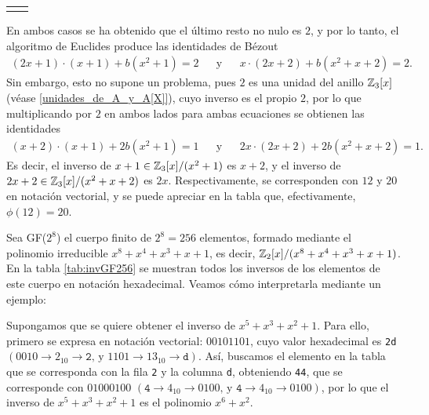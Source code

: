 \begin{Revision}
\begin{ejs}
\begin{center}
\begin{tabular}{cc}
\begin{minipage}[t]{0.4\textwidth}
                \end{minipage}
            \end{tabular}
        \end{center}
        En ambos casos se ha obtenido que el último resto no nulo es $2$, y por lo tanto, el algoritmo de Euclides produce las identidades de Bézout
        \begin{align*}
            (2x+1)\cdot (x + 1) + b(x^2 + 1) = 2 && \text{y} && x\cdot (2x+2) + b(x^2+x+2) = 2.
        \end{align*}
         Sin embargo, esto no supone un problema, pues $2$ es una unidad del anillo $\mathbb{Z}_3[x]$ (véase \ref{unidades_de_A_y_A[X]}), cuyo inverso es el propio $2$, por lo que multiplicando por $2$ en ambos lados para ambas ecuaciones se obtienen las identidades
         \begin{align*}
            (x+2)\cdot (x + 1) + 2b(x^2 + 1) = 1 && \text{y} && 2x\cdot (2x+2) + 2b(x^2+x+2) = 1.
        \end{align*}
         Es decir, el inverso de $x + 1 \in \mathbb{Z}_3[x]/(x^2 + 1)$ es $x + 2 $, y el inverso de $2x + 2 \in \mathbb{Z}_3[x]/(x^2 + x + 2) $ es $2x$. Respectivamente, se corresponden con $12$ y $20$ en notación vectorial, y se puede apreciar en la tabla que, efectivamente, $\phi(12) = 20$.
    
    \item Sea GF($2^8$) el cuerpo finito de $2^8 = 256$ elementos, formado mediante el polinomio irreducible $x^8 + x^4 + x^3 + x + 1$, es decir, $\mathbb{Z}_2[x]/(x^8 + x^4 + x^3 + x + 1)$. En la tabla \ref{tab:invGF256} se muestran todos los inversos de los elementos de este cuerpo en notación hexadecimal. Veamos cómo interpretarla mediante un ejemplo:
    
    Supongamos que se quiere obtener el inverso de $x^5 + x^3 +x^2+ 1$. Para ello, primero se expresa en notación vectorial: $00101101$, cuyo valor hexadecimal es \texttt{2d} $(0010\to 2_{10} \to\texttt{2} \text{, y } 1101\to 13_{10} \to\texttt{d})$. Así, buscamos el elemento en la tabla que se corresponda con la fila \texttt{2} y la columna \texttt{d}, obteniendo \texttt{44}, que se corresponde con $01000100$ $(\texttt{4}\to 4_{10} \to 0100\text{, y } \texttt{4}\to 4_{10} \to 0100)$, por lo que el inverso de $x^5 + x^3 +x^2+ 1$ es el polinomio $x^6 + x^2$.


\end{ejs}
\end{Revision}

